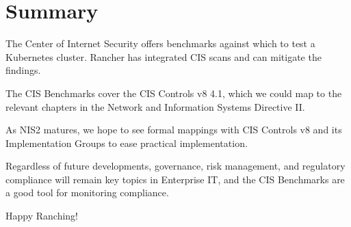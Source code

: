 %
%

\pagebreak
\section{Summary}

\onehalfspacing

The Center of Internet Security offers benchmarks against which to test a Kubernetes cluster. Rancher has integrated CIS scans and can mitigate the findings.

The CIS Benchmarks cover the CIS Controls v8 4.1, which we could map to the relevant chapters in the Network and Information Systems Directive II.

As NIS2 matures, we hope to see formal mappings with CIS Controls v8 and its Implementation Groups to ease practical implementation.

Regardless of future developments, governance, risk management, and regulatory compliance will remain key topics in Enterprise IT, and the CIS Benchmarks are a good tool for monitoring compliance.

Happy Ranching!
